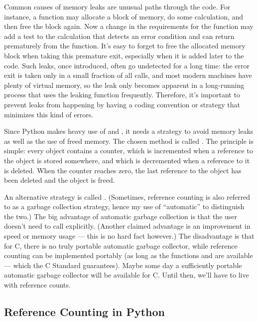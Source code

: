 Common causes of memory leaks are unusual paths through the code.  For
instance, a function may allocate a block of memory, do some
calculation, and then free the block again.  Now a change in the
requirements for the function may add a test to the calculation that
detects an error condition and can return prematurely from the
function.  It's easy to forget to free the allocated memory block when
taking this premature exit, especially when it is added later to the
code.  Such leaks, once introduced, often go undetected for a long
time: the error exit is taken only in a small fraction of all calls,
and most modern machines have plenty of virtual memory, so the leak
only becomes apparent in a long-running process that uses the leaking
function frequently.  Therefore, it's important to prevent leaks from
happening by having a coding convention or strategy that minimizes
this kind of errors.

Since Python makes heavy use of  and
, it needs a strategy to avoid memory leaks as well
as the use of freed memory.  The chosen method is called
.  The principle is simple: every object
contains a counter, which is incremented when a reference to the
object is stored somewhere, and which is decremented when a reference
to it is deleted.  When the counter reaches zero, the last reference
to the object has been deleted and the object is freed.

An alternative strategy is called .
(Sometimes, reference counting is also referred to as a garbage
collection strategy, hence my use of ``automatic'' to distinguish the
two.)  The big advantage of automatic garbage collection is that the
user doesn't need to call  explicitly.  (Another claimed
advantage is an improvement in speed or memory usage --- this is no
hard fact however.)  The disadvantage is that for C, there is no
truly portable automatic garbage collector, while reference counting
can be implemented portably (as long as the functions 
and  are available --- which the C Standard guarantees).
Maybe some day a sufficiently portable automatic garbage collector
will be available for C.  Until then, we'll have to live with
reference counts.

\subsection{Reference Counting in Python
            \label{refcountsInPython}}

